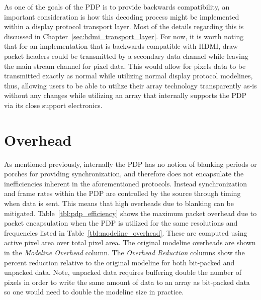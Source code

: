     As one of the goals of the PDP is to provide backwards compatibility, an important consideration is how this decoding process might be implemented within a display protocol transport layer. Most of the details regarding this is discussed in Chapter~\ref{sec:hdmi_transport_layer}. For now, it is worth noting that for an implementation that is backwards compatible with HDMI, draw packet headers could be transmitted by a secondary data channel while leaving the main stream channel for pixel data. This would allow for pixels data to be transmitted exactly as normal while utilizing normal display protocol modelines, thus, allowing users to be able to utilize their array technology transparently as-is without any changes while utilizing an array that internally supports the PDP via its close support electronics.

\section{Overhead}
    As mentioned previously, internally the PDP has no notion of blanking periods or porches for providing synchronization, and therefore does not encapsulate the inefficiencies inherent in the aforementioned protocols. Instead synchronization and frame rates within the PDP are controlled by the source through timing when data is sent. This means that high overheads due to blanking can be mitigated. Table~\ref{tbl:pdp_efficiency} shows the maximum packet overhead due to packet encapsulation when the PDP is utilized for the same resolutions and frequencies listed in Table~\ref{tbl:modeline_overhead}. These are computed using active pixel area over total pixel area. The original modeline overheads are shown in the {\it Modeline Overhead} column. The {\it Overhead Reduction} columns show the percent reduction relative to the original modeline for both bit-packed and unpacked data. Note, unpacked data requires buffering double the number of pixels in order to write the same amount of data to an array as bit-packed data so one would need to double the modeline size in practice.

